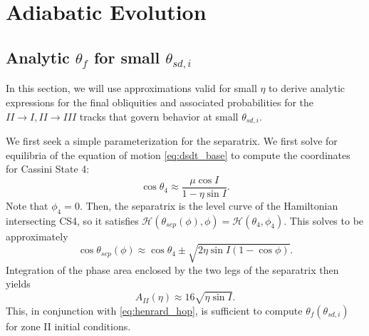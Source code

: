 \documentclass[
        fleqn,
        usenatbib,
    ]{mnras}
\newcommand*{\p}[1]{\left(#1\right)}
\begin{document}



\appendix

\section{Adiabatic Evolution}

\subsection{Analytic $\theta_f$ for small $\theta_{sd,
i}$}\label{ss:app_transition}

In this section, we will use approximations valid for small $\eta$ to derive
analytic expressions for the final obliquities and associated probabilities for
the $II \to I, II \to III$ tracks that govern behavior at small $\theta_{sd,
i}$.

We first seek a simple parameterization for the separatrix. We first solve for
equilibria of the equation of motion \autoref{eq:dsdt_base} to compute the
coordinates for Cassini State 4:
\begin{equation}
    \cos \theta_4 \approx \frac{\mu \cos I}{1 - \eta \sin I}.
\end{equation}
Note that $\phi_4 = 0$. Then, the separatrix is the level curve of the
Hamiltonian intersecting CS4, so it satisfies $\mathcal{H}\p{\theta_{sep}(\phi),
\phi} = \mathcal{H}\p{\theta_4, \phi_4}$. This solves to be approximately
\begin{equation}
    \cos \theta_{sep}(\phi) \approx \cos \theta_4 \pm
        \sqrt{2\eta \sin I\p{1 - \cos \phi}}.
\end{equation}
Integration of the phase area enclosed by the two legs of the separatrix then
yields
\begin{equation}
    A_{II}(\eta) \approx 16\sqrt{\eta \sin I}.\label{eq:a_approx}
\end{equation}
This, in conjunction with \autoref{eq:henrard_hop}, is sufficient to compute
$\theta_f\p{\theta_{sd, i}}$ for zone II initial conditions.
\end{document}
